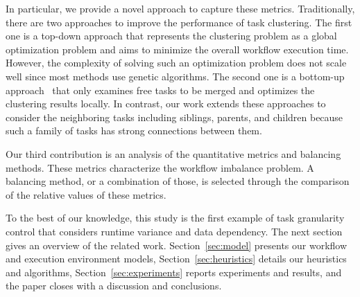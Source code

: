 \documentclass[final]{IEEEtran}
\begin{document}
In particular, we provide a novel approach to capture these metrics. Traditionally, there are two approaches to improve the performance of task clustering. The first one is a top-down approach \cite{6217508} that represents the clustering problem as a global optimization problem and aims to minimize the overall workflow execution time. However, the complexity of solving such an optimization problem does not scale well since most methods use genetic algorithms. The second one is a bottom-up approach~\cite{Muthuvelu:2005:DJG:1082290.1082297,4958835} that only examines free tasks to be merged and optimizes the clustering results locally. In contrast, our work extends these approaches to consider the neighboring tasks including siblings, parents, and children because such a family of tasks has strong connections between them. 

Our third contribution is an analysis of the quantitative metrics and balancing methods. These metrics characterize the workflow imbalance problem. A balancing method, or a combination of those, is selected through the comparison of the relative values of these metrics.


%

To the best of our knowledge, this study is the first example of task granularity control that considers runtime variance and data dependency. The next section gives an overview of the related work. Section~\ref{sec:model} presents our workflow and execution environment models, Section~\ref{sec:heuristics} details our heuristics and algorithms, Section~\ref{sec:experiments} reports experiments and results, and the paper closes with a discussion and conclusions.
\end{document}
